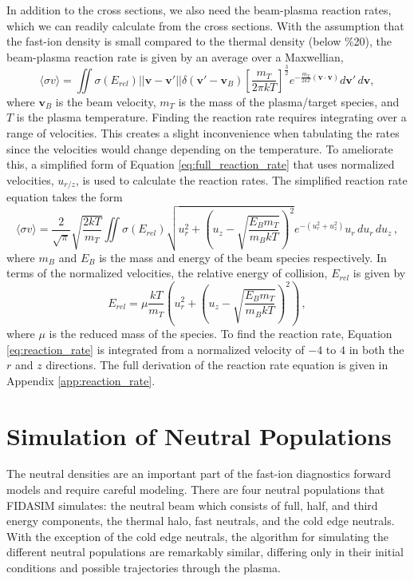 In addition to the cross sections, we also need the beam-plasma reaction rates, which we can readily calculate from the cross sections. With the assumption that the fast-ion density is small compared to the thermal density (below \%20), the beam-plasma reaction rate is given by an average over a Maxwellian,
\begin{equation}\label{eq:full_reaction_rate}
    \langle \sigma v \rangle = \iint \sigma(E_{rel}) ||\mathbf{v} - \mathbf{v'}|| \delta(\mathbf{v'}-\mathbf{v}_B) \left [ \frac{m_T}{2\pi kT} \right ]^{\frac{3}{2}} e^{-\frac{m_T}{2kT}(\mathbf{v}\cdot\mathbf{v})} d\mathbf{v}'\,d\mathbf{v} ,
\end{equation}
where $\mathbf{v}_B$ is the beam velocity, $m_T$ is the mass of the plasma/target species, and $T$ is the plasma temperature. Finding the reaction rate requires integrating over a range of velocities. This creates a slight inconvenience when tabulating the rates since the velocities would change depending on the temperature. To ameliorate this, a simplified form of Equation \ref{eq:full_reaction_rate} that uses normalized velocities, $u_{r/z}$, is used to calculate the reaction rates. The simplified reaction rate equation takes the form
\begin{equation}\label{eq:reaction_rate}
\langle \sigma v \rangle = \frac{2}{\sqrt{\pi}}\sqrt{\frac{2kT}{m_T}} \iint \sigma(E_{rel}) \sqrt{u_r^2 + \left (u_z - \sqrt{\frac{E_B m_T}{m_B kT}}\right)^2}  e^{-(u_r^2 + u_z^2)}u_r \,du_r\,du_z\,,
\end{equation}
where $m_B$ and $E_B$ is the mass and energy of the beam species respectively. In terms of the normalized velocities, the relative energy of collision, $E_{rel}$ is given by
\begin{equation}\label{eq:e_rel}
E_{rel} = \mu \frac{kT}{m_T} \left ( u_r^2 + \left(u_z - \sqrt{\frac{E_B m_T}{m_B kT}}\right)^2 \right )\,,
\end{equation}
where $\mu$ is the reduced mass of the species.
To find the reaction rate, Equation \ref{eq:reaction_rate} is integrated from a normalized velocity of $-4$ to $4$ in both the $r$ and $z$ directions.
The full derivation of the reaction rate equation is given in Appendix \ref{app:reaction_rate}. 

\section{Simulation of Neutral Populations}
The neutral densities are an important part of the fast-ion diagnostics forward models and require careful modeling.
There are four neutral populations that FIDASIM simulates: the neutral beam which consists of full, half, and third energy components, the thermal halo, fast neutrals, and the cold edge neutrals.
With the exception of the cold edge neutrals, the algorithm for simulating the different neutral populations are remarkably similar, differing only in their initial conditions and possible trajectories through the plasma.

